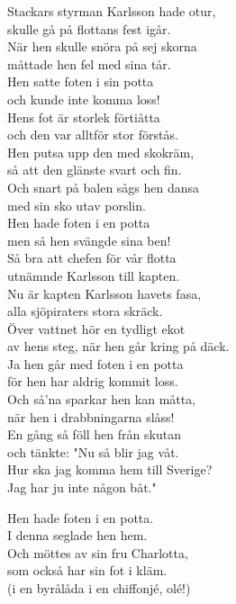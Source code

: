 \documentclass[a6paper,10pt]{article}
\begin{document}
\setlength{\oddsidemargin}{-0.37in}
\begin{center}
\end{center}
\vspace{-5pt}
\begin{lyrics}
\small Stackars styrman Karlsson hade otur,\\
skulle gå på flottans fest igår.\\
När hen skulle snöra på sej skorna\\
måttade hen fel med sina tår.
\vspace{5pt}\\
Hen satte foten i sin potta\\
och kunde inte komma loss!\\
Hens fot är storlek förtiåtta\\
och den var alltför stor förstås.
\vspace{5pt}\\
Hen putsa upp den med skokräm,\\
så att den glänste svart och fin.\\
Och snart på balen sågs hen dansa\\
med sin sko utav porslin.
\vspace{5pt}\\
Hen hade foten i en potta\\
men så hen svängde sina ben!\\
Så bra att chefen för vår flotta\\
utnämnde Karlsson till kapten.
\vspace{5pt}\\
Nu är kapten Karlsson havets fasa,\\
alla sjöpiraters stora skräck.\\
Över vattnet hör en tydligt ekot\\
av hens steg, när hen går kring på däck.
\vspace{5pt}\\
Ja hen går med foten i en potta\\
för hen har aldrig kommit loss.\\
Och så'na sparkar hen kan måtta,\\
när hen i drabbningarna slåss!
\vspace{5pt}\\
En gång så föll hen från skutan\\
och tänkte: "Nu så blir jag våt.\\
Hur ska jag komma hem till Sverige?\\
Jag har ju inte någon båt."

\setlength{\oddsidemargin}{-0.47in}
\noindent
Hen hade foten i en potta.\\
I denna seglade hen hem.\\
Och möttes av sin fru Charlotta,\\
som också har sin fot i kläm.\\
(i en byrålåda i en chiffonjé, olé!)
\end{lyrics}
\end{document}
